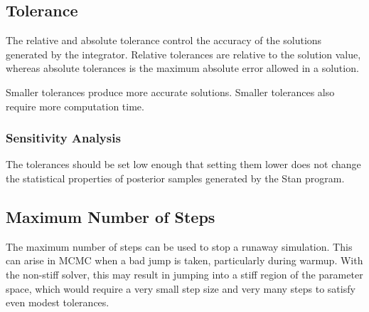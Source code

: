 \subsection{Tolerance}

The relative and absolute tolerance control the accuracy of the
solutions generated by the integrator.  Relative tolerances are
relative to the solution value, whereas absolute tolerances is the
maximum absolute error allowed in a solution.

Smaller tolerances produce more accurate solutions.  Smaller
tolerances also require more computation time.

\subsubsection{Sensitivity Analysis}

The tolerances should be set low enough that setting them lower does
not change the statistical properties of posterior samples generated
by the Stan program.

\subsection{Maximum Number of Steps}

The maximum number of steps can be used to stop a runaway simulation.
This can arise in MCMC when a bad jump is taken, particularly during
warmup.  With the non-stiff solver, this may result in jumping into a
stiff region of the parameter space, which would require a very small
step size and very many steps to satisfy even modest tolerances.
